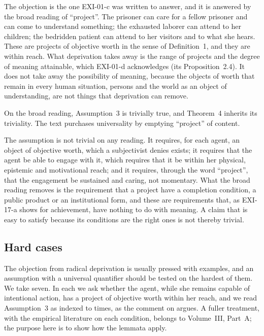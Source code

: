 \begin{reply}
The objection is the one EXI-01-c was written to answer, and it is answered by the broad reading of \enquote{project}. The prisoner can care for a fellow prisoner and can come to understand something; the exhausted laborer can attend to her children; the bedridden patient can attend to her visitors and to what she hears. These are projects of objective worth in the sense of Definition~1, and they are within reach. What deprivation takes away is the range of projects and the degree of meaning attainable, which EXI-01-d acknowledges (its Proposition~2.4). It does not take away the possibility of meaning, because the objects of worth that remain in every human situation, persons and the world as an object of understanding, are not things that deprivation can remove.
\end{reply}

\begin{objection}[Triviality]\label{o:trivialA3}
On the broad reading, Assumption~3 is trivially true, and Theorem~4 inherits its triviality. The text purchases universality by emptying \enquote{project} of content.
\end{objection}

\begin{reply}
The assumption is not trivial on any reading. It requires, for each agent, an object of objective worth, which a subjectivist denies exists; it requires that the agent be able to engage with it, which requires that it be within her physical, epistemic and motivational reach; and it requires, through the word \enquote{project}, that the engagement be sustained and caring, not momentary. What the broad reading removes is the requirement that a project have a completion condition, a public product or an institutional form, and these are requirements that, as EXI-17-a shows for achievement, have nothing to do with meaning. A claim that is easy to satisfy because its conditions are the right ones is not thereby trivial.
\end{reply}

\subsection{Hard cases}\label{s:hard}

The objection from radical deprivation is usually pressed with examples, and an assumption with a universal quantifier should be tested on the hardest of them. We take seven. In each we ask whether the agent, while she remains capable of intentional action, has a project of objective worth within her reach, and we read Assumption~3 as indexed to times, as the comment on  argues. A fuller treatment, with the empirical literature on each condition, belongs to Volume~III, Part~A; the purpose here is to show how the lemmata apply.

